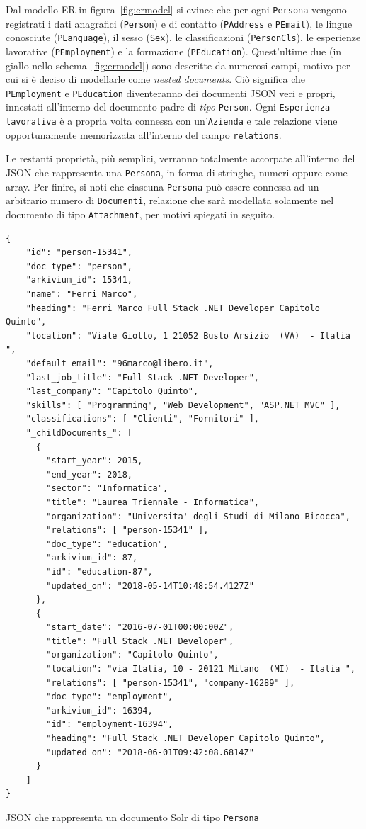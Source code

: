 Dal modello ER in figura~\ref{fig:ermodel} si evince che per ogni \texttt{Persona} vengono registrati i dati anagrafici (\texttt{Person}) e di contatto (\texttt{PAddress} e \texttt{PEmail}), le lingue conosciute (\texttt{PLanguage}), il sesso (\texttt{Sex}), le classificazioni (\texttt{PersonCls}), le esperienze lavorative (\texttt{PEmployment}) e la formazione (\texttt{PEducation}). Quest’ultime due (in giallo nello schema~\ref{fig:ermodel}) sono descritte da numerosi campi, motivo per cui si è deciso di modellarle come \textit{nested documents}. Ciò significa che \texttt{PEmployment} e \texttt{PEducation} diventeranno dei documenti JSON veri e propri, innestati all’interno del documento padre di \textit{tipo} \texttt{Person}. Ogni \texttt{Esperienza lavorativa} è a propria volta connessa con un’\texttt{Azienda} e tale relazione viene opportunamente memorizzata all’interno del campo \texttt{relations}.

Le restanti proprietà, più semplici, verranno totalmente accorpate all’interno del JSON che rappresenta una \texttt{Persona}, in forma di stringhe, numeri oppure come array. Per finire, si noti che ciascuna \texttt{Persona} può essere connessa ad un arbitrario numero di \texttt{Documenti}, relazione che sarà modellata solamente nel documento di tipo \texttt{Attachment}, per motivi spiegati in seguito. 

\begin{listing}[H]
\begin{verbatim}
{ 
    "id": "person-15341",
    "doc_type": "person",
    "arkivium_id": 15341, 
    "name": "Ferri Marco",
    "heading": "Ferri Marco Full Stack .NET Developer Capitolo Quinto",
    "location": "Viale Giotto, 1 21052 Busto Arsizio  (VA)  - Italia ",
    "default_email": "96marco@libero.it",
    "last_job_title": "Full Stack .NET Developer",
    "last_company": "Capitolo Quinto",
    "skills": [ "Programming", "Web Development", "ASP.NET MVC" ],
    "classifications": [ "Clienti", "Fornitori" ],
    "_childDocuments_": [
      {
        "start_year": 2015,
        "end_year": 2018,
        "sector": "Informatica",
        "title": "Laurea Triennale - Informatica",
        "organization": "Universita' degli Studi di Milano-Bicocca",
        "relations": [ "person-15341" ],
        "doc_type": "education",
        "arkivium_id": 87,
        "id": "education-87",
        "updated_on": "2018-05-14T10:48:54.4127Z"
      },
      {
        "start_date": "2016-07-01T00:00:00Z",
        "title": "Full Stack .NET Developer",
        "organization": "Capitolo Quinto",
        "location": "via Italia, 10 - 20121 Milano  (MI)  - Italia ",
        "relations": [ "person-15341", "company-16289" ],
        "doc_type": "employment",
        "arkivium_id": 16394,
        "id": "employment-16394",
        "heading": "Full Stack .NET Developer Capitolo Quinto",
        "updated_on": "2018-06-01T09:42:08.6814Z"
      }
    ]
}
\end{verbatim}
\caption{JSON che rappresenta un documento Solr di tipo \texttt{Persona}}
\label{code:personjson}
\end{listing}

